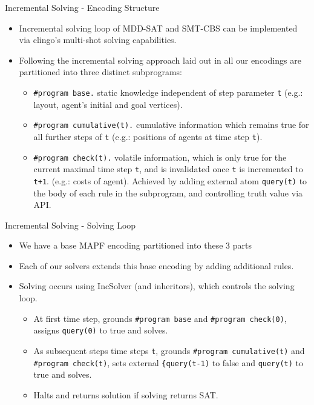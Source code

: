 \documentclass[aspectratio=169,xcolor=svgnames]{beamer}
\theoremstyle{theoremstyle_space}
\begin{document}
\begin{frame}[fragile=singleslide]{Incremental Solving - Encoding Structure}
\begin{itemize}
    \item Incremental solving loop of MDD-SAT and SMT-CBS can be implemented via clingo's multi-shot solving capabilities.
    \item Following the incremental solving approach laid out in \cite{kaminski2021build} all our encodings are partitioned into three distinct subprograms:
    \begin{itemize}
        \item \verb|#program base.| 
        static knowledge independent of step parameter \verb|t| (e.g.: layout, agent's initial and goal vertices).
        \item \verb|#program cumulative(t).| cumulative information which remains true for all further steps of \verb|t| (e.g.: positions of agents at time step \verb|t|).
        \item \verb|#program check(t).| volatile information, which is only true for the current maximal time step \verb|t|, and is invalidated once \verb|t| is incremented to \verb|t+1|. (e.g.: costs of agent). Achieved by adding external atom \verb|query(t)| to the body of each rule in the subprogram, and controlling truth value via API.
        \end{itemize}
\end{itemize}
\end{frame}

\begin{frame}[fragile=singleslide]{Incremental Solving - Solving Loop}
\begin{itemize}
    \item We have a base MAPF encoding partitioned into these 3 parts
    \item Each of our solvers extends this base encoding by adding additional rules.
    \item Solving occurs using IncSolver (and inheritors), which controls the solving loop.
    \begin{itemize}
        \item At first time step, grounds \verb|#program base| and     \verb|#program check(0)|, assigns \verb|query(0)| to true and          solves.
        \item As subsequent steps time steps \verb|t|, grounds \verb|#program cumulative(t)| and \verb|#program check(t)|, sets external \verb|{query(t-1)| to           false and \verb|query(t)| to true and solves.
        \item Halts and returns solution if solving returns SAT.
    \end{itemize}
\end{itemize}
\end{frame}
\end{document}
